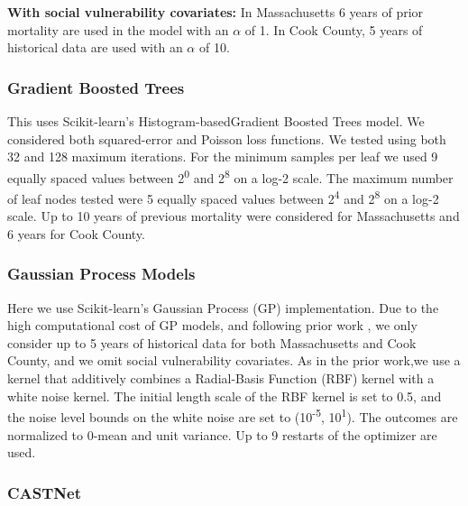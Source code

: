 \textbf{With social vulnerability covariates:} In Massachusetts 6 years of prior mortality are used in the model with an $\alpha$ of 1. In Cook County, 5 years of historical data are used with an $\alpha$ of 10.

\subsubsection{Gradient Boosted Trees}\label{gradient-boosted-trees}

This uses Scikit-learn's \citep{buitinckAPIDesignMachine2013} Histogram-basedGradient Boosted Trees model. We considered both squared-error and Poisson loss functions. We tested using both 32 and 128 maximum iterations. For the minimum samples per leaf we used 9 equally spaced values between 2\textsuperscript{0} and 2\textsuperscript{8} on a log-2 scale. The maximum number of leaf nodes tested were 5 equally spaced values between 2\textsuperscript{4} and 2\textsuperscript{8} on a log-2 scale. Up to 10 years of previous mortality were considered for Massachusetts and 6 years for Cook County.

\subsubsection{Gaussian Process Models}\label{gaussian-process-models}

Here we use Scikit-learn's \citep{buitinckAPIDesignMachine2013} Gaussian Process (GP) implementation. Due to the high computational cost of GP models, and following prior work \citep{allenTranslatingPredictiveAnalytics2023}, we only consider up to 5 years of historical data for both Massachusetts and Cook County, and we omit social vulnerability covariates. As in the prior work,we use a kernel that additively combines a Radial-Basis Function (RBF) kernel with a white noise kernel. The initial length scale of the RBF kernel is set to 0.5, and the noise level bounds on the white noise are set to (10\textsuperscript{-5}, 10\textsuperscript{1}). The outcomes are normalized to 0-mean and unit variance. Up to 9 restarts of the optimizer are used.

\subsubsection{CASTNet}\label{castnet}

